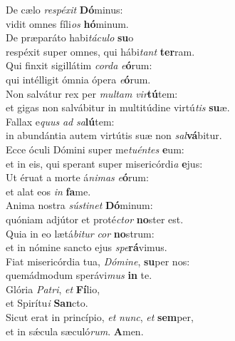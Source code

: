 \evenverse De cælo \textit{re}\textit{spé}\textit{xit} \textbf{Dó}minus:~\*\\
\evenverse vidit omnes fíli\textit{os} \textbf{hó}minum.\\
\oddverse De præparáto habi\textit{tá}\textit{cu}\textit{lo} \textbf{su}o~\*\\
\oddverse respéxit super omnes, qui hábi\textit{tant} \textbf{ter}ram.\\
\evenverse Qui finxit sigillátim \textit{cor}\textit{da} \textit{e}\textbf{ó}rum:~\*\\
\evenverse qui intélligit ómnia ópera \textit{e}\textbf{ó}rum.\\
\oddverse Non salvátur rex per \textit{mul}\textit{tam} \textit{vir}\textbf{tú}tem:~\*\\
\oddverse et gigas non salvábitur in multitúdine virtú\textit{tis} \textbf{su}æ.\\
\evenverse Fallax e\textit{quus} \textit{ad} \textit{sa}\textbf{lú}tem:~\*\\
\evenverse in abundántia autem virtútis suæ non \textit{sal}\textbf{vá}bitur.\\
\oddverse Ecce óculi Dómini super me\textit{tu}\textit{én}\textit{tes} \textbf{e}um:~\*\\
\oddverse et in eis, qui sperant super misericórdi\textit{a} \textbf{e}jus:\\
\evenverse Ut éruat a morte á\textit{ni}\textit{mas} \textit{e}\textbf{ó}rum:~\*\\
\evenverse et alat eos \textit{in} \textbf{fa}me.\\
\oddverse Anima nostra \textit{sú}\textit{sti}\textit{net} \textbf{Dó}minum:~\*\\
\oddverse quóniam adjútor et proté\textit{ctor} \textbf{no}ster est.\\
\evenverse Quia in eo lætá\textit{bi}\textit{tur} \textit{cor} \textbf{no}strum:~\*\\
\evenverse et in nómine sancto ejus \textit{spe}\textbf{rá}vimus.\\
\oddverse Fiat misericórdia tua, \textit{Dó}\textit{mi}\textit{ne}, \textbf{su}per nos:~\*\\
\oddverse quemádmodum sperávi\textit{mus} \textbf{in} te.\\
\evenverse Glória \textit{Pa}\textit{tri}, \textit{et} \textbf{Fí}lio,~\*\\
\evenverse et Spirítu\textit{i} \textbf{San}cto.\\
\oddverse Sicut erat in princípio, \textit{et} \textit{nunc}, \textit{et} \textbf{sem}per,~\*\\
\oddverse et in sǽcula sæculó\textit{rum}. \textbf{A}men.\\
